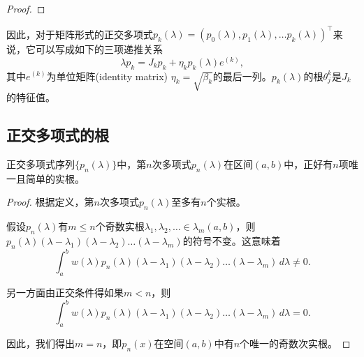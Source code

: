 \begin{subappendices}
\begin{proof}
\end{proof}

因此，对于矩阵形式的正交多项式$p_k(\lambda) = \left(p_0(\lambda), p_1(\lambda), \ldots p_k(\lambda) \right)^{\top}$来说，它可以写成如下的三项递推关系
\begin{equation*}
  \lambda p_k = J_k p_k + \eta_k p_k(\lambda) e^{(k)},
\end{equation*}
其中$e^{(k)}$为单位矩阵(identity matrix) $\eta_k = \sqrt{\beta_k}$的最后一列。$p_k(\lambda)$的根$\theta_j^{k}$是$J_k$的特征值。

\subsection{正交多项式的根}

\begin{theorem}[正交多项式根的特征]
  \label{theorem:poly-roots-properties}
  正交多项式序列$\{p_n(\lambda)\}$中，第$n$次多项式$p_n(\lambda)$在区间$(a,b)$中，正好有$n$项唯一且简单的实根。
\end{theorem}
\begin{proof}
  根据定义，第$n$次多项式$p_n(\lambda)$至多有$n$个实根。

  假设$p_n(\lambda)$有$m \le n$个奇数实根$\lambda_1, \lambda_2, \ldots \in \lambda_m (a,b)$，则$p_n(\lambda)(\lambda-\lambda_1)(\lambda-\lambda_2)\ldots(\lambda-\lambda_m)$的符号不变。这意味着
  \begin{equation*}
    \int_{a}^{b}w(\lambda) p_n(\lambda) (\lambda-\lambda_1)(\lambda-\lambda_2)\ldots(\lambda-\lambda_m) \, d \lambda \neq 0.
  \end{equation*}

  另一方面由正交条件得如果$m<n$，则
  \begin{equation*}
    \int_{a}^{b}w(\lambda) p_n(\lambda) (\lambda-\lambda_1)(\lambda-\lambda_2)\ldots(\lambda-\lambda_m) \, d \lambda = 0.
  \end{equation*}

  因此，我们得出$m=n$，即$p_n(x)$在空间$(a,b)$中有$n$个唯一的奇数次实根。
\end{proof}


\end{subappendices}
